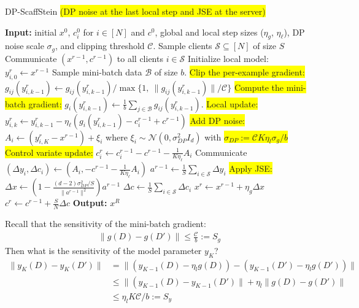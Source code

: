 


\begin{algorithm}[H]
\caption{DP-ScaffStein \colorbox{yellow}{(DP noise at the {\color{red}last} local step and JSE at the server)}}
\label{algo:scaffstein_1}
\begin{algorithmic}[1]
\State \textbf{Input:} initial $x^0$, $c_i^0$ for $i \in [N]$ and $c^0$, global and local step sizes ($\eta_g$, $\eta_\ell$), DP noise scale $\sigma_g$, and clipping threshold $\mathcal{C}$.
\State Sample clients $\mathcal{S} \subseteq [N]$ of size $S$
\State Communicate $(x^{r-1}, c^{r-1})$ to all clients $i \in \mathcal{S}$
\State Initialize local model: $y_{i,0}^{r} \gets x^{r-1}$
\State Sample mini-batch data $\mathcal{B}$ of size $b$.
\State \colorbox{yellow}{Clip the per-example gradient:}
\State $g_{ij}(y^r_{i,k-1}) \gets g_{ij}(y^r_{i,k-1}) / \max \{1, \ \|g_{ij}(y^r_{i,k-1})\|/\mathcal{C}\} $
\EndFor
\State \colorbox{yellow}{Compute the mini-batch gradient:}
$g_{i}(y_{i,k-1}^{r}) \gets \frac{1}{b} \sum_{j \in \mathcal{B}} g_{ij}(y_{i,k-1}^{r})$.
\State \colorbox{yellow}{Local update:} $y_{i,k}^{r} \gets y_{i,k-1}^{r} - \eta_\ell (g_i(y_{i,k-1}^{r}) - c_i^{r-1} + c^{r-1})$
\EndFor
\State \colorbox{yellow}{Add DP noise:}  $A_i \gets (y_{i,K}^{r} - x^{r-1}) + \xi_i$ where $\xi_i \sim \mathcal{N}(0, \sigma_{DP}^2 I_d)$ with \colorbox{yellow}{$\sigma_{DP}:=  \mathcal{C} K \eta_l \sigma_g/b$}
\State \colorbox{yellow}{Control variate update:} $c_i^r \gets c_i^{r-1} - c^{r-1} - \frac{1}{K \eta_\ell}A_i$
\State Communicate $(\Delta y_i,\Delta c_i) \gets (A_i, - c^{r-1} - \frac{1}{K \eta_\ell}A_i)$ 
\EndFor
\State $a^{r-1} \gets \frac{1}{S} \sum_{i \in \mathcal{S}} \Delta y_i$
\State \colorbox{yellow}{Apply JSE:} $\Delta x \gets  \left( 1 - \frac{(d-2)\sigma_{DP}^2/S}{\|a^{r-1}\|^2} \right) a^{r-1}$
\State $\Delta c \gets \frac{1}{S} \sum_{i \in \mathcal{S}} \Delta c_i$
\State $x^r \gets x^{r-1} + \eta_g \Delta x$
\State $c^r \gets c^{r-1} +\frac{S}{N}\Delta c$
\EndFor
\State \textbf{Output:} $x^R$
\end{algorithmic}
\end{algorithm}

Recall that the sensitivity of the mini-batch gradient:
\begin{align}
    \| g (D) - g(D') \| \leq \frac{\mathcal{C}}{b} := S_g
\end{align}
Then what is the sensitivity of the model parameter $y_K$?
\begin{align*}
\|y_K(D) - y_K(D') \| & = \| \left(y_{K-1}(D) - \eta_l g(D) \right) - \left(y_{K-1}(D') - \eta_l g(D') \right) \|     \\
& \leq \|  \left(y_{K-1}(D) - y_{K-1}(D') \| + \eta_l \| g(D) - g(D')\| \\
& \leq \eta_l K \mathcal{C} /b := S_y
\end{align*}



